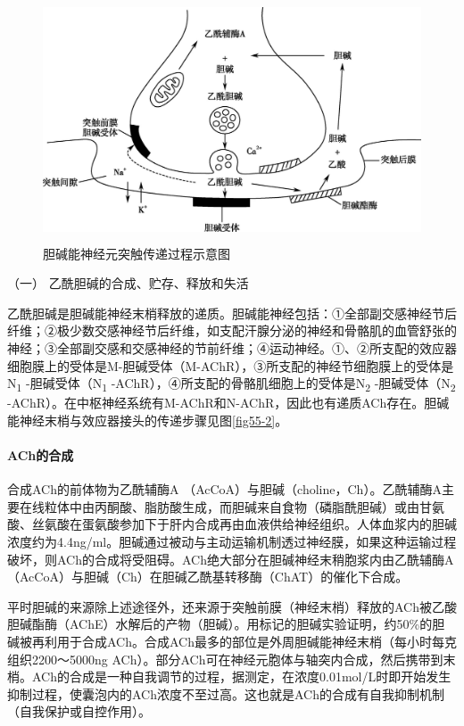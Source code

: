 \begin{figure}[!htbp]
 \centering
 \includegraphics[width=4.77083in,height=2.83333in]{./images/Image00198.jpg}
 \captionsetup{justification=centering}
 \caption{胆碱能神经元突触传递过程示意图}
 \label{fig55-1}
  \end{figure} 

\hypertarget{text00139.htmlux5cux23CHP5-3-1-1-1}{}
（一） 乙酰胆碱的合成、贮存、释放和失活

乙酰胆碱是胆碱能神经末梢释放的递质。胆碱能神经包括：①全部副交感神经节后纤维；②极少数交感神经节后纤维，如支配汗腺分泌的神经和骨骼肌的血管舒张的神经；③全部副交感和交感神经的节前纤维；④运动神经。①、②所支配的效应器细胞膜上的受体是M-胆碱受体（M-AChR），③所支配的神经节细胞膜上的受体是N\textsubscript{1}
-胆碱受体（N\textsubscript{1}
-AChR），④所支配的骨骼肌细胞上的受体是N\textsubscript{2}
-胆碱受体（N\textsubscript{2}
-AChR）。在中枢神经系统有M-AChR和N-AChR，因此也有递质ACh存在。胆碱能神经末梢与效应器接头的传递步骤见图\ref{fig55-2}。

\paragraph{ACh的合成}

合成ACh的前体物为乙酰辅酶A
（AcCoA）与胆碱（choline，Ch）。乙酰辅酶A主要在线粒体中由丙酮酸、脂肪酸生成，而胆碱来自食物（磷脂酰胆碱）或由甘氨酸、丝氨酸在蛋氨酸参加下于肝内合成再由血液供给神经组织。人体血浆内的胆碱浓度约为4.4ng/ml。胆碱通过被动与主动运输机制透过神经膜，如果这种运输过程破坏，则ACh的合成将受阻碍。ACh绝大部分在胆碱神经末稍胞浆内由乙酰辅酶A（AcCoA）与胆碱（Ch）在胆碱乙酰基转移酶（ChAT）的催化下合成。

平时胆碱的来源除上述途径外，还来源于突触前膜（神经末梢）释放的ACh被乙酸胆碱酯酶（AChE）水解后的产物（胆碱）。用标记的胆碱实验证明，约50\%的胆碱被再利用于合成ACh。合成ACh最多的部位是外周胆碱能神经末梢（每小时每克组织2200～5000ng
ACh）。部分ACh可在神经元胞体与轴突内合成，然后携带到末梢。ACh的合成是一种自我调节的过程，据测定，在浓度0.01mol/L时即开始发生抑制过程，使囊泡内的ACh浓度不至过高。这也就是ACh的合成有自我抑制机制（自我保护或自控作用）。

